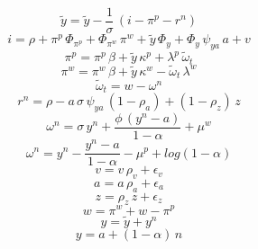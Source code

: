 \begin{dmath}
{{\tilde{y}}}={{\tilde{y}}}-\frac{1}{{{\sigma}}}\, \left({{i}}-{{\pi^p}}-{{r^n}}\right)
\end{dmath}
\begin{dmath}
{{i}}={{\rho}}+{{\pi^p}}\, {{\Phi_{\pi^p}}}+{{\Phi_{\pi^w}}}\, {{\pi^w}}+{{\tilde{y}}}\, {{\Phi_{y}}}+{{\Phi_{y}}}\, {{\psi_{ya}}}\, {{a}}+{{v}}
\end{dmath}
\begin{dmath}
{{\pi^p}}={{\pi^p}}\, {{\beta}}+{{\tilde{y}}}\, {{\kappa^p}}+{{\lambda^p}}\, {{\tilde{\omega}_t}}
\end{dmath}
\begin{dmath}
{{\pi^w}}={{\pi^w}}\, {{\beta}}+{{\tilde{y}}}\, {{\kappa^w}}-{{\tilde{\omega}_t}}\, {{\lambda^w}}
\end{dmath}
\begin{dmath}
{{\tilde{\omega}_t}}={{w}}-{{\omega^n}}
\end{dmath}
\begin{dmath}
{{r^n}}={{\rho}}-{{a}}\, {{\sigma}}\, {{\psi_{ya}}}\, \left(1-{{\rho_a}}\right)+\left(1-{{\rho_z}}\right)\, {{z}}
\end{dmath}
\begin{dmath}
{{\omega^n}}={{\sigma}}\, {{y^n}}+\frac{{{\phi}}\, \left({{y^n}}-{{a}}\right)}{1-{{\alpha}}}+{{\mu^w}}
\end{dmath}
\begin{dmath}
{{\omega^n}}={{y^n}}-\frac{{{y^n}}-{{a}}}{1-{{\alpha}}}-{{\mu^p}}+log\left(1-{{\alpha}}\right)
\end{dmath}
\begin{dmath}
{{v}}={{v}}\, {{\rho_v}}+{{\epsilon_v}}
\end{dmath}
\begin{dmath}
{{a}}={{a}}\, {{\rho_a}}+{{\epsilon_a}}
\end{dmath}
\begin{dmath}
{{z}}={{\rho_z}}\, {{z}}+{{\epsilon_z}}
\end{dmath}
\begin{dmath}
{{w}}={{\pi^w}}+{{w}}-{{\pi^p}}
\end{dmath}
\begin{dmath}
{{y}}={{\tilde{y}}}+{{y^n}}
\end{dmath}
\begin{dmath}
{{y}}={{a}}+\left(1-{{\alpha}}\right)\, {{n}}
\end{dmath}

